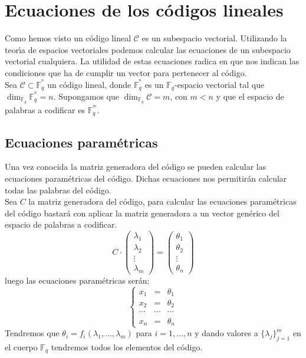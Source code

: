 %
%

\section{Ecuaciones de los c\'odigos lineales}

Como hemos visto un c\'odigo lineal $\mathcal{C}$ es un subespacio vectorial.
Utilizando la teor\'{\i}a de espacios vectoriales podemos calcular las
ecuaciones de un subespacio vectorial cualquiera. La utilidad de estas
ecuaciones radica en que nos indican las condiciones que ha de cumplir un
vector para pertenecer al c\'odigo.\\

Sea $\mathcal{C}\subset \mathbb{F}^{^n}_q$ un c\'odigo lineal, donde
$\mathbb{F}^{^n}_q$ es un $\mathbb{F}_q$-espacio vectorial tal que
$\dim_{\mathbb{F}_q} \mathbb{F}^{^n}_q=n$. Supongamos que
$\dim_{\mathbb{F}_q} \mathcal{C} = m$, con $m<n$ y que el espacio de palabras
a codificar es $\mathbb{F}^{^m}_q$.
%
\newpage
%
\subsection{Ecuaciones param\'etricas}\label{sec:EcuParametricas}

Una vez conocida la matriz generadora del c\'odigo se pueden calcular las
ecuaciones param\'etricas del c\'odigo. Dichas ecuaciones nos permitir\'an
calcular todas las palabras del c\'odigo.\\

Sea $C$ la matriz generadora del c\'odigo, para calcular las ecuaciones
pa\-ra\-m\'etricas del c\'odigo bastar\'a con aplicar la matriz generadora a un
vector gen\'erico del espacio de palabras a codificar.
\begin{displaymath}
C\cdot \left( \begin{array}{c}
\lambda_1\\
\lambda_2\\
\vdots\\
\lambda_m
\end{array} \right) =
\left( \begin{array}{c}
\theta_1\\
\theta_2\\
\vdots\\
\theta_n
\end{array} \right)
\end{displaymath}
luego las ecuaciones param\'etricas ser\'an:
\begin{displaymath}
\left\{ \begin{array}{ccc}
x_1 &=&\theta_1\\
x_2 &=&\theta_2\\
\cdots&\cdots&\cdots\\
x_n &=&\theta_n
\end{array} \right.
\end{displaymath}
Tendremos que $\theta_i = f_i (\lambda_1,\dots,\lambda_m)$ para $i=1,\dots,n$ y
dando valores a $\{\lambda_j \}_{j=1}^m$ en el cuerpo $\mathbb{F}_q$ tendremos
todos los elementos del c\'odigo.

